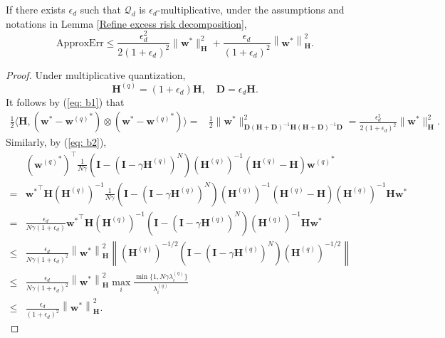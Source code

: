 \documentclass[11pt, letterpaper]{article}
\begin{document}
\begin{lemma}
    \label{lem: b1}
    If there exists $\epsilon_d$ such that $\mathcal{Q}_d$ is $\epsilon_d$-multiplicative, under the assumptions and notations in Lemma \ref{Refine excess risk decomposition}, 
    \begin{equation*}
        \mathrm{ApproxErr}\leq \frac{\epsilon_d^2}{2(1+\epsilon_d)^2}\|\mathbf{w}^*\|_\mathbf{H}^2+\frac{\epsilon_d}{(1+\epsilon_d)^2}\left\|\mathbf{w}^*\right\|_\mathbf{H}^2.
    \end{equation*}
\end{lemma}
\begin{proof}
    Under multiplicative quantization, 
    \begin{equation*}
        \mathbf{H}^{(q)}=(1+\epsilon_d)\mathbf{H}, \quad \mathbf{D}=\epsilon_d\mathbf{H}.
    \end{equation*}
    It follows by (\ref{eq: b1}) that 
    \begin{equation*}
        \begin{aligned}
            \frac{1}{2}\langle\mathbf{H},({\mathbf{w}}^*-{\mathbf{w}^{(q)}}^*)\otimes({\mathbf{w}}^*-{\mathbf{w}^{(q)}}^*)\rangle=&\frac{1}{2}\|\mathbf{w}^*\|_{\mathbf{D}(\mathbf{H}+\mathbf{D})^{-1}\mathbf{H}(\mathbf{H}+\mathbf{D})^{-1}\mathbf{D}}^2=\frac{\epsilon_d^2}{2(1+\epsilon_d)^2}\|\mathbf{w}^*\|_\mathbf{H}^2.
        \end{aligned}
    \end{equation*}
    Similarly, by (\ref{eq: b2}),
    \begin{equation*}
        \begin{aligned}
            &\left({\mathbf{w}^{(q)}}^*\right)^\top\frac{1}{N\gamma}\left(\mathbf{I}-(\mathbf{I}-\gamma\mathbf{H}^{(q)})^N\right)(\mathbf{H}^{(q)})^{-1}\left(\mathbf{H}^{(q)}-\mathbf{H}\right){\mathbf{w}^{(q)}}^*\\
            =&{\mathbf{w}^*}^\top \mathbf{H}(\mathbf{H}^{(q)})^{-1}\frac{1}{N\gamma}\left(\mathbf{I}-(\mathbf{I}-\gamma\mathbf{H}^{(q)})^N\right)(\mathbf{H}^{(q)})^{-1}\left(\mathbf{H}^{(q)}-\mathbf{H}\right)(\mathbf{H}^{(q)})^{-1}\mathbf{H}\mathbf{w}^*\\
            =&\frac{\epsilon_d}{N\gamma(1+\epsilon_d)}{\mathbf{w}^*}^\top \mathbf{H}(\mathbf{H}^{(q)})^{-1}\left(\mathbf{I}-(\mathbf{I}-\gamma\mathbf{H}^{(q)})^N\right)(\mathbf{H}^{(q)})^{-1}\mathbf{H}\mathbf{w}^*\\
            \leq& \frac{\epsilon_d}{N\gamma(1+\epsilon_d)^2} \left\|\mathbf{w}^*\right\|_\mathbf{H}^2\left\|(\mathbf{H}^{(q)})^{-1/2}\left(\mathbf{I}-(\mathbf{I}-\gamma\mathbf{H}^{(q)})^N\right)(\mathbf{H}^{(q)})^{-1/2}\right\|\\
            \leq&\frac{\epsilon_d}{N\gamma(1+\epsilon_d)^2} \left\|\mathbf{w}^*\right\|_\mathbf{H}^2\max_i \frac{\min\{1,N\gamma\lambda_i^{(q)}\}}{{\lambda}_i^{(q)}}\\
            \leq&\frac{\epsilon_d}{(1+\epsilon_d)^2}\left\|\mathbf{w}^*\right\|_\mathbf{H}^2.
        \end{aligned}
    \end{equation*}
\end{proof}
\end{document}
